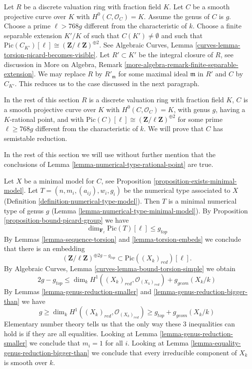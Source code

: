 \medskip\noindent
Let $R$ be a discrete valuation ring with fraction field $K$.
Let $C$ be a smooth projective curve over $K$ with $H^0(C, \mathcal{O}_C) = K$.
Assume the genus of $C$ is $g$.
Choose a prime $\ell > 768g$ different from the characteristic of $k$.
Choose a finite separable extension $K'/K$ of
such that $C(K') \not = \emptyset$ and such that
$\text{Pic}(C_{K'})[\ell] \cong (\mathbf{Z}/\ell \mathbf{Z})^{\oplus 2}$.
See
Algebraic Curves, Lemma \ref{curves-lemma-torsion-picard-becomes-visible}.
Let $R' \subset K'$ be the integral closure of $R$, see
discussion in More on Algebra, Remark
\ref{more-algebra-remark-finite-separable-extension}.
We may replace $R$ by $R'_{\mathfrak m}$ for some maximal ideal
$\mathfrak m$ in $R'$ and $C$ by $C_{K'}$. This
reduces us to the case discussed in the next paragraph.

\medskip\noindent
In the rest of this section
$R$ is a discrete valuation ring with fraction field $K$,
$C$ is a smooth projective curve over $K$ with $H^0(C, \mathcal{O}_C) = K$,
with genus $g$, having a $K$-rational point, and with
$\text{Pic}(C)[\ell] \cong (\mathbf{Z}/\ell \mathbf{Z})^{\oplus 2}$
for some prime $\ell \geq 768g$ different from the characteristic of $k$.
We will prove that $C$ has semistable reduction.

\medskip\noindent
In the rest of this section we will use without further mention
that the conclusions of Lemma \ref{lemma-numerical-type-rational-point}
are true.

\medskip\noindent
Let $X$ be a minimal model for $C$, see
Proposition \ref{proposition-exists-minimal-model}.
Let $T = (n, m_i, (a_{ij}), w_i, g_i)$
be the numerical type associated to $X$
(Definition \ref{definition-numerical-type-model}).
Then $T$ is a minimal numerical type of genus $g$
(Lemma \ref{lemma-numerical-type-minimal-model}).
By Proposition \ref{proposition-bound-picard-group}
we have
$$
\dim_{\mathbf{F}_\ell} \text{Pic}(T)[\ell] \leq g_{top}
$$
By Lemmas \ref{lemma-sequence-torsion} and \ref{lemma-torsion-embeds}
we conclude that there is an embedding
$$
(\mathbf{Z}/\ell \mathbf{Z})^{\oplus 2g - g_{top}}
\subset \text{Pic}((X_k)_{red})[\ell].
$$
By Algebraic Curves, Lemma \ref{curves-lemma-bound-torsion-simple} we obtain
$$
2g - g_{top} \leq
\dim_k H^1((X_k)_{red}, \mathcal{O}_{(X_k)_{red}}) + g_{geom}(X_k/k)
$$
By Lemmas \ref{lemma-genus-reduction-smaller} and
\ref{lemma-genus-reduction-bigger-than}
we have
$$
g \geq \dim_k H^1((X_k)_{red}, \mathcal{O}_{(X_k)_{red}}) \geq
g_{top} + g_{geom}(X_k/k)
$$
Elementary number theory tells us that the only way these $3$
inequalities can hold is if they are all equalities.
Looking at Lemma \ref{lemma-genus-reduction-smaller}
we conclude that $m_i = 1$ for all $i$.
Looking at Lemma \ref{lemma-equality-genus-reduction-bigger-than}
we conclude that every irreducible component of $X_k$
is smooth over $k$.

